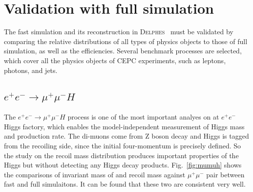 \documentclass[a4paper,10pt,twoside]{cpc-hepnp}
\begin{document}
\section{Validation with full simulation\label{sec:validation}}

The fast simulation and its reconstruction in {\textsc{Delphes}~} must be validated by comparing the relative distributions
of all types of physics objects to those of full simulation, as well as the efficiencies.
Several benchmark processes are selected, which cover all the physics objects of CEPC experiments, such as leptons, photons, and jets.


\subsection{$e^+e^-\to \mu^+\mu^-H$}

The $e^+e^- \to \mu^+\mu^-H$ process is one of the most important analyes on at $e^+e^-$ Higgs factory,
which enables the model-independent measurement of Higgs mass and production rate.
The di-muons come from Z boson decay and Higgs is tagged from the recoiling side, since the initial four-momentum is precisely defined.
So the study on the recoil mass distribution produces important properties of the Higgs but without detecting any Higgs decay products.
Fig.~\ref{fig:mumuh} shows the comparisons of invariant mass of and recoil mass against $\mu^+\mu^-$ pair between fast and full simulaitons.
It can be found that these two are consistent very well.
\end{document}
